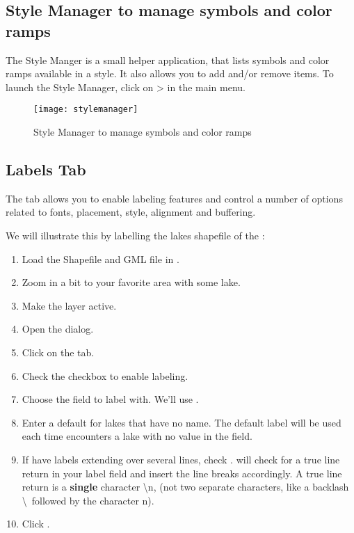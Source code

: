 \subsection{Style Manager to manage symbols and color ramps}\label{subsec:stylemanager}

The Style Manger is a small helper application, that lists symbols and color
ramps available in a style. It also allows you to add and/or remove items. To
launch the Style Manager, click on  >  in the main menu.

\begin{figure}[ht]
   \centering
   \texttt{[image: stylemanager]}
   \caption{Style Manager to manage symbols and color ramps \nixcaption}\label{fig:stylemanager}
\end{figure}

\subsection{Labels Tab}\label{labeltab}

The  tab allows you to enable labeling features and control a number of
options related to fonts, placement, style, alignment and buffering.

We will illustrate this by labelling the lakes shapefile of the
:

\begin{enumerate}
\item Load the Shapefile  and GML file  in \qg.
\item Zoom in a bit to your favorite area with some lake.
\item Make the  layer active.
\item Open the  dialog.
\item Click on the  tab.
\item Check the  checkbox to enable labeling.
\item Choose the field to label with.
  We'll use .
\item Enter a default for lakes that have no name. The default label will be
  used each time \qg encounters a lake with no value in the 
field.
\item If have labels extending over several lines, check . \qg will check for a true line return in your label field and
insert the line breaks accordingly. A true line return is a \textbf{single}
character \textbackslash n, (not two separate characters, like a backlash
\textbackslash ~followed by the character n).
\item Click .
\end{enumerate}

